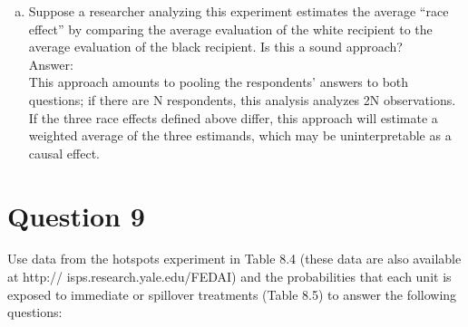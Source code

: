 \documentclass[11pt,notitlepage]{article}\usepackage[]{graphicx}\usepackage[]{color}
\begin{document}
\begin{enumerate}[a)]
\item Suppose a researcher analyzing this experiment estimates the average ``race effect'' by comparing the average evaluation of the white recipient to the average evaluation of the black recipient. Is this a sound approach?\\
Answer:\\
This approach amounts to pooling the respondents' answers to both questions; if there are N respondents, this analysis analyzes 2N observations. If the three race effects defined above differ, this approach will estimate a weighted average of the three estimands, which may be uninterpretable as a causal effect.
\end{enumerate}


\section*{Question 9}
Use data from the hotspots experiment in Table 8.4 (these data are also available at http:// isps.research.yale.edu/FEDAI) and the probabilities that each unit is exposed to immediate or spillover treatments (Table 8.5) to answer the following questions:
\end{document}
